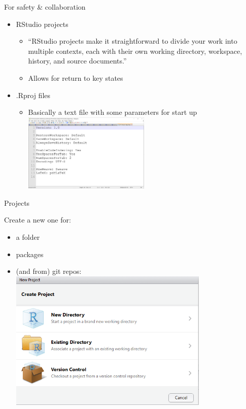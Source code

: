 \documentclass[
  ignorenonframetext,
]{beamer}
\providecommand{\tightlist}{%
  \setlength{\itemsep}{0pt}\setlength{\parskip}{0pt}}
\begin{document}
\begin{frame}{For safety \& collaboration}
\protect\hypertarget{for-safety-collaboration}{}

\begin{itemize}[<+->]
\tightlist
\item
  RStudio projects

  \begin{itemize}[<+->]
  \tightlist
  \item
    ``RStudio projects make it straightforward to divide your work into
    multiple contexts, each with their own working directory, workspace,
    history, and source documents.''
  \item
    Allows for return to key states
  \end{itemize}
\item
  .Rproj files

  \begin{itemize}[<+->]
  \tightlist
  \item
    Basically a text file with some parameters for start up
    \includegraphics[width=0.5\textwidth,height=\textheight]{../external/images/Rproj_inside.PNG}
  \end{itemize}
\end{itemize}

\end{frame}

\begin{frame}{Projects}
\protect\hypertarget{projects}{}

Create a new one for:

\begin{itemize}[<+->]
\tightlist
\item
  a folder
\item
  packages
\item
  (and from) git repos:
  \includegraphics[width=0.75\textwidth,height=\textheight]{../external/images/setup_2_rstudio_project.PNG}
\end{itemize}

\end{frame}
\end{document}
